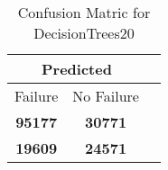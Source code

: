 \begin{table}[] 
\caption{Confusion Matric for DecisionTrees20} 
\label{Table: Prediction Accuracy-DMDDecisionTrees20OnlySunEKF-resetReflectionEKF-top2-Reflection} 
\centering 
\begin{tabular} 
 {@{}ccc@{}} 
\toprule 
\multicolumn{2}{c}{\textbf{Predicted}}
 \\ \midrule 
\multicolumn{1}{|c|}{Failure} & 
\multicolumn{1}{c|}{No Failure}
 \\ \midrule 
\multicolumn{1}{|c|}{\color{green}\textbf{95177}} & 
\multicolumn{1}{c|}{\color{green}\textbf{30771}}
 \\ \midrule 
\multicolumn{1}{|c|}{\color{red}\textbf{19609}} & 
\multicolumn{1}{c|}{\color{red}\textbf{24571}}
 \\ \bottomrule 
\end{tabular} 
\end{table} 

